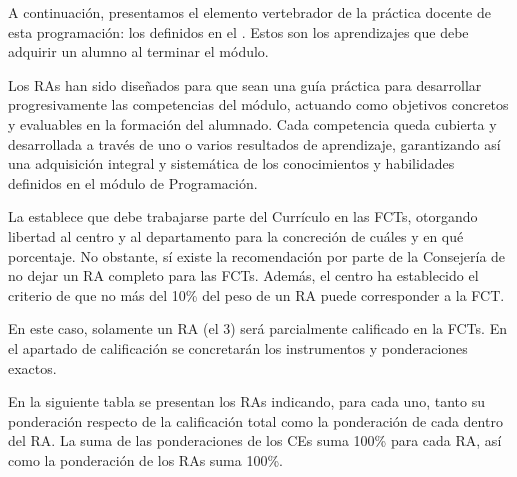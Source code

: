 \newcommand{\pondRAp}[1]{\pondRA{#1}\%}
\newcommand{\pondRA}[1]{%
  \ifnum#1=1
    10%
  \else\ifnum#1=2
    20%
  \else\ifnum#1=3
    30%
  \else\ifnum#1=4
  	30%
  \else\ifnum#1=5
  	30%
  \else\ifnum#1=6
  	30%
  \else\ifnum#1=7
  	30%
  \else\ifnum#1=8
  	30%
  \else\ifnum#1=9
  	30%
  \fi\fi\fi\fi\fi\fi\fi\fi\fi
}

A continuación, presentamos el elemento vertebrador de la práctica docente de esta programación: los  definidos en el . Estos son los aprendizajes que debe adquirir un alumno al terminar el módulo. 

Los RAs han sido diseñados para que sean una guía práctica para desarrollar progresivamente las competencias del módulo, actuando como objetivos concretos y evaluables en la formación del alumnado.
%
Cada competencia queda cubierta y desarrollada a través de uno o varios resultados de aprendizaje, garantizando así una adquisición integral y sistemática de los conocimientos y habilidades definidos en el módulo de Programación.

La  establece que debe trabajarse parte del Currículo en las FCTs, otorgando libertad al centro y al departamento para la concreción de cuáles y en qué porcentaje. No obstante, sí existe la recomendación por parte de la Consejería de no dejar un RA completo para las FCTs. Además, el centro ha establecido el criterio de que no más del 10\% del peso de un RA puede corresponder a la FCT. 

En este caso, solamente un RA (el 3) será parcialmente calificado en la FCTs. En el apartado de calificación se concretarán los instrumentos y ponderaciones exactos.

En la siguiente tabla se presentan los RAs indicando, para cada uno, tanto su ponderación respecto de la calificación total como la ponderación de cada  dentro del RA. La suma de las ponderaciones de los CEs suma 100\% para cada RA, así como la ponderación de los RAs suma 100\%.

